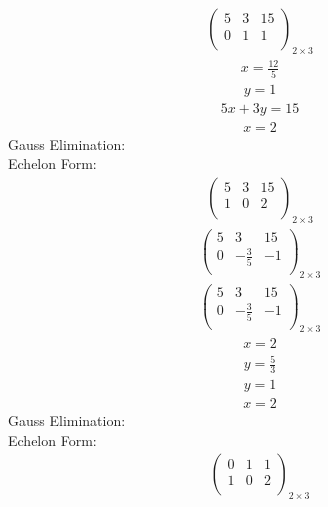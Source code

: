 \documentclass{article}
\begin{document}
\begin{align*}
\left(
\begin{array}{cc|c}
5 & 3 & 15\\
0 & 1 & 1\\
\end{array}
\right)_{2\times 3}
\end{align*}
\begin{align*}
x=\frac{12}{5}\end{align*}
\begin{align*}
y=1\end{align*}
\begin{align*}
5x + 3y=15\end{align*}
\begin{align*}
x=2\end{align*}
Gauss Elimination:\\
Echelon Form:\\
\begin{align*}
\left(
\begin{array}{cc|c}
5 & 3 & 15\\
1 & 0 & 2\\
\end{array}
\right)_{2\times 3}
\end{align*}
\begin{align*}
\left(
\begin{array}{cc|c}
5 & 3 & 15\\
0 & -\frac{3}{5} & -1\\
\end{array}
\right)_{2\times 3}
\end{align*}
\begin{align*}
\left(
\begin{array}{cc|c}
5 & 3 & 15\\
0 & -\frac{3}{5} & -1\\
\end{array}
\right)_{2\times 3}
\end{align*}
\begin{align*}
x=2\end{align*}
\begin{align*}
y=\frac{5}{3}\end{align*}
\begin{align*}
y=1\end{align*}
\begin{align*}
x=2\end{align*}
Gauss Elimination:\\
Echelon Form:\\
\begin{align*}
\left(
\begin{array}{cc|c}
0 & 1 & 1\\
1 & 0 & 2\\
\end{array}
\right)_{2\times 3}
\end{align*}
\end{document}
